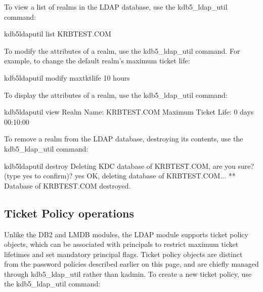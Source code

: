 \documentclass[letterpaper,10pt,english]{sphinxmanual}
\begin{document}
To view a list of realms in the LDAP database, use the kdb5\_ldap\_util
 command:

%
\begin{sphinxVerbatim}[commandchars=\\\{\}]
\PYGZdl{} kdb5\PYGZus{}ldap\PYGZus{}util list
KRBTEST.COM
\end{sphinxVerbatim}

To modify the attributes of a realm, use the kdb5\_ldap\_util 
command.  For example, to change the default realm’s maximum ticket
life:

%
\begin{sphinxVerbatim}[commandchars=\\\{\}]
\PYGZdl{} kdb5\PYGZus{}ldap\PYGZus{}util modify \PYGZhy{}maxtktlife \PYGZdq{}10 hours\PYGZdq{}
\end{sphinxVerbatim}

To display the attributes of a realm, use the kdb5\_ldap\_util 
command:

%
\begin{sphinxVerbatim}[commandchars=\\\{\}]
\PYGZdl{} kdb5\PYGZus{}ldap\PYGZus{}util view
               Realm Name: KRBTEST.COM
      Maximum Ticket Life: 0 days 00:10:00
\end{sphinxVerbatim}

To remove a realm from the LDAP database, destroying its contents, use
the kdb5\_ldap\_util  command:

%
\begin{sphinxVerbatim}[commandchars=\\\{\}]
\PYGZdl{} kdb5\PYGZus{}ldap\PYGZus{}util destroy
Deleting KDC database of \PYGZsq{}KRBTEST.COM\PYGZsq{}, are you sure?
(type \PYGZsq{}yes\PYGZsq{} to confirm)? yes
OK, deleting database of \PYGZsq{}KRBTEST.COM\PYGZsq{}...
** Database of \PYGZsq{}KRBTEST.COM\PYGZsq{} destroyed.
\end{sphinxVerbatim}


\subsection{Ticket Policy operations}
\label{\detokenize{admin/database:ticket-policy-operations}}
Unlike the DB2 and LMDB modules, the LDAP module supports ticket
policy objects, which can be associated with principals to restrict
maximum ticket lifetimes and set mandatory principal flags.  Ticket
policy objects are distinct from the password policies described
earlier on this page, and are chiefly managed through kdb5\_ldap\_util
rather than kadmin.  To create a new ticket policy, use the
kdb5\_ldap\_util  command:
\end{document}
